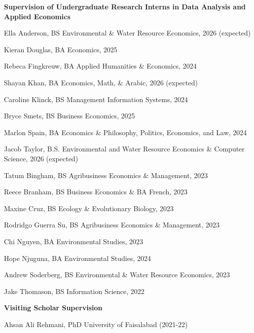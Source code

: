 \documentclass[letterpaper]{article}
\renewenvironment{itemize}{
  \begin{list}
  	{}{
    \setlength{\leftmargin}{1.5em}
    \setlength{\itemsep}{-.5em}
  }
}{
  \end{list}
}
\begin{document}
\begin{itemize}
	\leftskip 0in
	\item {\bf Supervision of Undergraduate Research Interns in Data Analysis and Applied Economics}
	\begin{itemize}
		\item Ella Anderson, BS Environmental \& Water Resource Economics, 2026 (expected)
		\item Kieran Douglas, BA Economics, 2025
		\item Rebeca Fingkreuw, BA Applied Humanities \& Economics, 2024
		\item Shayan Khan, BA Economics, Math, \& Arabic, 2026 (expected)
		\item Caroline Klinck, BS Management Information Systems, 2024
		\item Bryce Smets, BS Business Economics, 2025
		\item Marlon Spain, BA Economics \& Philosophy, Politics, Economics, and Law, 2024
		\item Jacob Taylor, B.S. Environmental and Water Resource Economics \& Computer Science, 2026 (expected)
		\item Tatum Bingham, BS Agribusiness Economics \& Management, 2023
		\item Reece Branham, BS Business Economics \& BA French, 2023
		\item Maxine Cruz, BS Ecology \& Evolutionary Biology, 2023
		\item Rodridgo Guerra Su, BS Agribusiness Economics \& Management, 2023
		\item Chi Nguyen, BA Environmental Studies, 2023
		\item Hope Njuguna, BA Environmental Studies, 2024
		\item Andrew Soderberg, BS Environmental \& Water Resource Economics, 2023
		\item Jake Thomason, BS Information Science, 2022 \\
	\end{itemize}


	\leftskip 0in
	\item {\bf Visiting Scholar Supervision}
	\begin{itemize}
		\item Ahsan Ali Rehmani, PhD University of Faisalabad (2021-22)
	\end{itemize}
\end{itemize}
\end{document}
